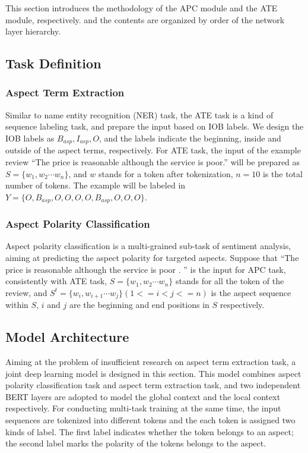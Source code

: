 \documentclass[a4paper,fleqn]{cas-sc}
\begin{document}
This section introduces the methodology of the APC module and the ATE module, respectively. and the contents are organized by order of the network layer hierarchy.

\subsection{Task Definition}
\subsubsection{Aspect Term Extraction}
Similar to name entity recognition (NER) task, the ATE task is a kind of sequence labeling task, and prepare the input based on IOB labels. We design the IOB labels as $B_{asp}, I_{asp}, O$, and the labels indicate the beginning, inside and outside of the aspect terms, respectively. For ATE task, the input of the example review ``The price is reasonable although the service is poor.'' will be prepared as $S=\{w_1,w_2 \cdots w_n\}$, and $w$ stands for a token after tokenization, $n=10$ is the total number of tokens. The example will be labeled in $Y=\{O, B_{asp}, O, O, O, O, B_{asp}, O, O, O\}$. 

\subsubsection{Aspect Polarity Classification}
Aspect polarity classification is a multi-grained sub-task of sentiment analysis, aiming at predicting the aspect polarity for targeted aspects. Suppose that ``The price is reasonable although the service is poor . '' is the input for APC task, consistently with ATE task, $S=\{w_1,w_2 \cdots w_n\}$ stands for all the token of the review, and $S^t=\{w_i,w_{i+1} \cdots w_{j}\} (1<=i<j<=n)$ is the aspect sequence within $S$, $i$ and $j$ are the beginning and end positions in $S$ respectively. 

\subsection{Model Architecture}

Aiming at the problem of insufficient research on aspect term extraction task, a joint deep learning model is designed in this section. This model combines aspect polarity classification task and aspect term extraction task, and two independent BERT layers are adopted to model the global context and the local context respectively. For conducting multi-task training at the same time, the input sequences are tokenized into different tokens and the each token is assigned two kinds of label. The first label indicates whether the token belongs to an aspect; the second label marks the polarity of the tokens belongs to the aspect.
\end{document}
